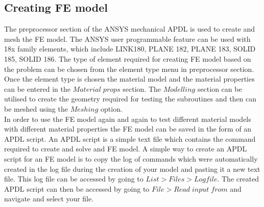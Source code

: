 \documentclass[a4paper,12pt]{extarticle}
\begin{document}
\subsection{Creating FE model}
\indent\indent\indent  The preprocessor section of the ANSYS mechanical APDL is used to create and mesh the FE model. The ANSYS user programmable feature can be used with 18x family elements, which include LINK180, PLANE 182, PLANE 183, SOLID 185, SOLID 186. The type of element required for creating FE model based on the problem can be chosen from the element type menu in preprocessor section. Once the element type is chosen the material model and the material properties can be entered in the $Material\; props$ section.  The $Modelling$ section can be utilised to create the geometry required for testing the subroutines and then can be meshed using the $Meshing$ option.\\ \indent\indent\indent In order to use the FE model again and again to test different material models with different material properties the FE model can be saved in the form of an APDL script. An APDL script is a simple text file which contains the command required to create and solve and FE model. A simple way to create an APDL script for an FE model is to copy the log of commands which were automatically created in the log file during the creation of your model and pasting it a new text file. This log file can be accessed by going to $List>Files>Logfile$. The created APDL script can then be accessed by going to $File>Read \;input\; from$ and navigate and select your file.
\end{document}
